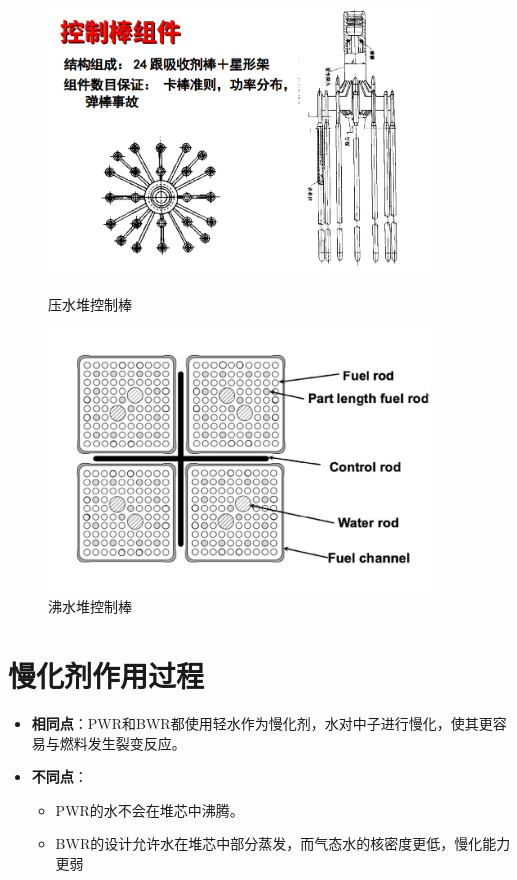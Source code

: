 \documentclass{article}
\begin{document}
\begin{figure}[htbp]
    \centering
    \begin{minipage}{0.45\textwidth}
        \centering
        \includegraphics[width=0.9\textwidth]{figures/PWR-control-rod.png}
        \caption{压水堆控制棒}
        \label{fig:PWR-control-rod}
    \end{minipage}
    \hfill
    \begin{minipage}{0.45\textwidth}
        \centering
        \includegraphics[width=0.9\textwidth]{figures/BWR-control-rod.png}
        \caption{沸水堆控制棒}
        \label{fig:BWR-control-rod}
    \end{minipage}
\end{figure}

\section{慢化剂作用过程}
\begin{itemize}
    \item \textbf{相同点}：PWR和BWR都使用轻水作为慢化剂，水对中子进行慢化，使其更容易与燃料发生裂变反应。
    \item \textbf{不同点}：
    \begin{itemize}
        \item PWR的水不会在堆芯中沸腾。
        \item BWR的设计允许水在堆芯中部分蒸发，而气态水的核密度更低，慢化能力更弱
    \end{itemize}
\end{itemize}
\end{document}
